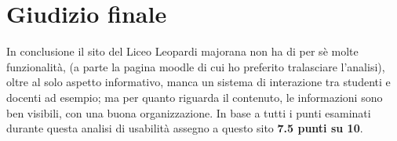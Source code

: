 \documentclass[12pt]{article}
\begin{document}
\section{Giudizio finale}
In conclusione il sito del Liceo Leopardi majorana non ha di per s\`e molte funzionalit\`a, (a parte la pagina moodle di cui ho preferito tralasciare l'analisi), oltre al solo aspetto informativo, manca un sistema di interazione tra studenti e docenti ad esempio; ma per quanto riguarda il contenuto, le informazioni sono ben visibili, con una buona organizzazione. In base a tutti i punti esaminati durante questa analisi di usabilit\`a assegno a questo sito \textbf{7.5 punti su 10}.
\end{document}
